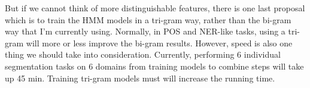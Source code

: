 \documentclass[11pt]{article}
\begin{document}
But if we cannot think of more distinguishable features, there is one last proposal which is to train the HMM models in a tri-gram way, rather than the bi-gram way that I'm currently using. Normally, in POS and NER-like tasks, using a tri-gram will more or less improve the bi-gram results. However, speed is also one thing we should take into consideration. Currently, performing 6 individual segmentation tasks on 6 domains from training models to combine steps will take up 45 min. Training tri-gram models must will increase the running time. 








%
%
\end{document}
